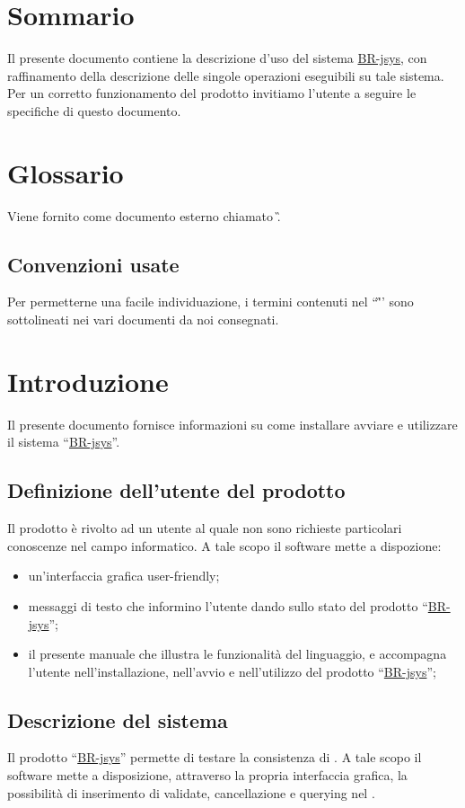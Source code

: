 \tableofcontents 
\chapter*{Sommario}
Il presente documento contiene la descrizione d'uso del sistema \underline{BR-jsys}, con raffinamento della descrizione delle singole operazioni eseguibili su tale sistema. Per un corretto funzionamento del prodotto invitiamo l'utente a seguire le specifiche di questo documento.

\chapter*{Glossario}
Viene fornito come documento esterno chiamato \G. 
\section*{Convenzioni usate}
Per permetterne una facile individuazione, i termini contenuti nel ``\G'' sono sottolineati nei vari documenti da noi consegnati.

\chapter{Introduzione}
Il presente documento fornisce informazioni su come installare avviare e utilizzare il sistema ``\underline{BR-jsys}''.
\section{Definizione dell'utente del prodotto}
Il prodotto \`e rivolto ad un utente al quale non sono richieste particolari conoscenze nel campo informatico. A tale scopo il software mette a dispozione:
\begin{itemize}
\item un'interfaccia grafica user-friendly;
\item messaggi di testo che informino l'utente dando sullo stato del prodotto ``\underline{BR-jsys}'';
\item il presente manuale che illustra le funzionalit\`a del linguaggio, e accompagna l'utente nell'installazione, nell'avvio e nell'utilizzo del prodotto ``\underline{BR-jsys}'';
\end{itemize}

\section{Descrizione del sistema}
Il prodotto ``\underline{BR-jsys}'' permette di testare la consistenza di \bo. A tale scopo il software mette a disposizione, attraverso la propria interfaccia grafica, la possibilit\`a di inserimento di \br validate, cancellazione e querying nel \rp.

